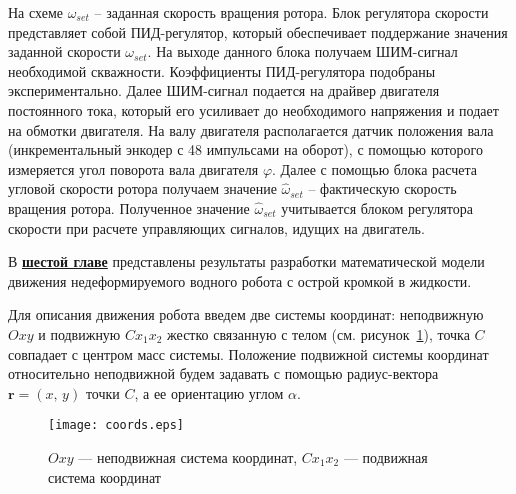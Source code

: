 На схеме $ \omega_{set} $ -- заданная скорость вращения ротора. Блок регулятора скорости представляет собой ПИД-регулятор, который обеспечивает поддержание значения заданной скорости $ \omega_{set} $. На выходе данного блока получаем ШИМ-сигнал необходимой скважности. Коэффициенты ПИД-регулятора подобраны экспериментально. Далее ШИМ-сигнал подается на драйвер двигателя постоянного тока, который его усиливает до необходимого напряжения и подает на обмотки двигателя. 
На валу двигателя располагается датчик положения вала (инкрементальный энкодер с 48 импульсами на оборот), с помощью которого измеряется угол поворота вала двигателя $ \varphi $. Далее с помощью блока расчета угловой скорости ротора получаем значение $ \hat{\omega}_{set} $ -- фактическую скорость вращения ротора. Полученное значение $ \hat{\omega}_{set} $ учитывается блоком регулятора скорости при расчете управляющих сигналов, идущих на двигатель. 

















В \underline{\textbf{шестой главе}} представлены результаты разработки математической модели движения недеформируемого водного робота с острой кромкой в жидкости.

Для описания движения робота введем две системы координат: неподвижную $Oxy$ и подвижную $Cx_1x_2$ жестко связанную с телом (см. рисунок~\ref{fig.coords}), точка $C$ совпадает с центром масс системы. 
Положение подвижной системы координат относительно неподвижной будем задавать с помощью радиус-вектора $\bm r = (x,\, y)$ точки $C$, а ее ориентацию углом $\alpha$. %

\begin{figure}[h!]
	\centering
	\texttt{[image: coords.eps]}
	\caption{$Oxy$ --- неподвижная система координат, $Cx_1x_2$ --- подвижная система координат}\label{fig.coords}
\end{figure}

